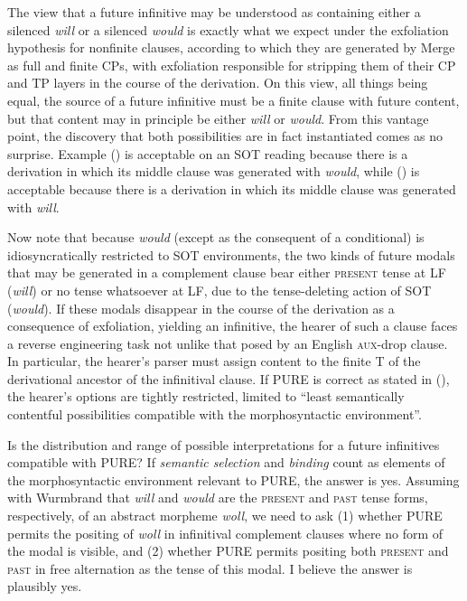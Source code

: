 \documentclass[output=paper]{langscibook}
\begin{document}
The view that a future infinitive may be understood as containing either a silenced \textit{will} or a silenced \textit{would} is exactly what we expect under the exfoliation hypothesis for nonfinite clauses, according to which they are generated by Merge as full and finite CPs, with exfoliation responsible for stripping them of their CP and TP layers in the course of the derivation. On this view, all things being equal, the source of a future infinitive must be a finite clause with future content, but that content may in principle be either \textit{will} or \textit{would}. From this vantage point, the discovery that both possibilities are in fact instantiated comes as no surprise. Example () is acceptable on an SOT reading because there is a derivation in which its middle clause was generated with \textit{would}, while () is acceptable because there is a derivation in which its middle clause was generated with \textit{will}.

Now note that because \textit{would} (except as the consequent of a conditional) is idiosyncratically restricted to SOT environments, the two kinds of future modals that may be generated in a complement clause bear either \textsc{present} tense at LF (\textit{will}) or no tense whatsoever at LF, due to the tense-deleting action of SOT (\textit{would}). If these modals disappear in the course of the derivation as a consequence of exfoliation, yielding an infinitive, the hearer of such a clause faces a reverse engineering task not unlike that posed by an English \textsc{aux}-drop clause. In particular, the hearer's parser must assign content to the finite T of the derivational ancestor of the infinitival clause. If PURE is correct as stated in (), the hearer's options are tightly restricted, limited to “least semantically contentful possibilities compatible with the morphosyntactic environment”. 

Is the distribution and range of possible interpretations for a future infinitives compatible with PURE? If \textit{semantic selection} and \textit{binding} count as elements of the morphosyntactic environment relevant to PURE, the answer is yes. Assuming with Wurmbrand that \textit{will} and \textit{would} are the \textsc{present} and \textsc{past} tense forms, respectively, of an abstract morpheme \textit{woll}, we need to ask (1) whether PURE permits the positing of \textit{woll} in infinitival complement clauses where no form of the modal is visible, and (2) whether PURE permits positing both \textsc{present} and \textsc{past} in free alternation as the tense of this modal. I believe the answer is plausibly yes. 
\end{document}

